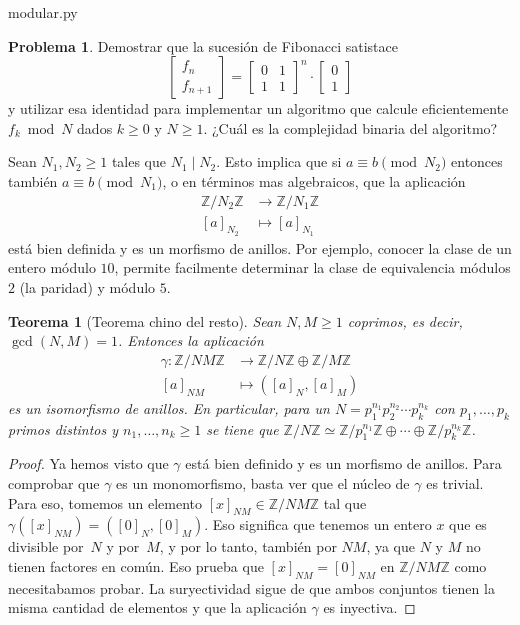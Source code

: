 \documentclass[a4paper, 11pt]{article}
\newcommand{\ZZ}{\mathbb{Z}}
\newcounter{numerodetema}
\theoremstyle{plain}
\newtheorem{teor}{Teorema}[numerodetema]
\theoremstyle{definition}
\newtheorem{prob}{Problema}[numerodetema]
\begin{document}
\bigskip


{modular.py}

\begin{prob}
Demostrar que la sucesión de Fibonacci satistace
\[
   \left[\begin{array}{c} f_{n} \\ f_{n+1} \end{array}\right] =
   \left[\begin{array}{cc} 0 & 1 \\ 1 & 1 \end{array}\right]^n\cdot
   \left[\begin{array}{c} 0 \\ 1 \end{array}\right]
\]
y utilizar esa identidad para implementar un algoritmo que calcule
eficientemente $f_k\bmod N$ dados $k\geq 0$ y $N\geq 1$. ¿Cuál es
la complejidad binaria del algoritmo?
\end{prob}

\bigskip

Sean $N_1,N_2\geq 1$ tales que $N_1\mid N_2$. Esto implica que si
$a\equiv b\pmod{N_2}$ entonces también $a\equiv b\pmod{N_1}$, o en
términos mas algebraicos, que la aplicación
\[
\begin{aligned}
\ZZ/N_2\ZZ & \rightarrow\ZZ/N_1\ZZ \\
[a]_{N_2} &\mapsto [a]_{N_1}
\end{aligned}
\]
está bien definida y es un morfismo de anillos. Por ejemplo, conocer
la clase de un entero módulo $10$, permite facilmente determinar la
clase de equivalencia módulos $2$ (la paridad) y módulo $5$.

\begin{teor}[Teorema chino del resto]\label{teor_chino}
Sean $N,M\geq 1$ coprimos, es decir, $\gcd(N,M)=1$. Entonces la aplicación
\[
\begin{aligned}
\gamma:\ZZ/NM\ZZ & \rightarrow\ZZ/N\ZZ\oplus\ZZ/M\ZZ \\
[a]_{NM} & \mapsto ([a]_N,[a]_M)
\end{aligned}
\]
es un isomorfismo de anillos. En particular, para un
$N=p_1^{n_1}p_2^{n_2}\cdots p_k^{n_k}$ con $p_1,\ldots,p_k$ primos
distintos y $n_1,\ldots,n_k\geq 1$ se tiene que
$\ZZ/N\ZZ\simeq\ZZ/p_1^{n_1}\ZZ\oplus\cdots\oplus\ZZ/p_k^{n_k}\ZZ$.
\end{teor}
\begin{proof}
Ya hemos visto que $\gamma$ está bien definido y es un morfismo de anillos.
Para comprobar que $\gamma$ es un monomorfismo, basta ver que el núcleo de
$\gamma$ es trivial. Para eso, tomemos un elemento $[x]_{NM}\in\ZZ/NM\ZZ$ tal
que $\gamma([x]_{NM})=([0]_N,[0]_M)$. Eso significa que tenemos un entero $x$
que es divisible por~$N$ y por~$M$, y por lo tanto, también por $NM$, ya que
$N$ y $M$ no tienen factores en común. Eso prueba que $[x]_{NM}=[0]_{NM}$ en
$\ZZ/NM\ZZ$ como necesitabamos probar. La suryectividad sigue de que ambos
conjuntos tienen la misma cantidad de elementos y que la aplicación $\gamma$
es inyectiva.
\end{proof}
\end{document}
